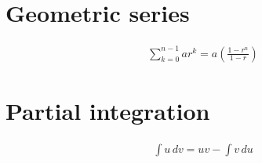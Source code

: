 \section{Geometric series}
\begin{align}
\sum_{k=0}^{n-1} ar^k= a \left(\frac{1-r^{n}}{1-r}\right)
\end{align}

\section{Partial integration}
\begin{align}
    \int u \, dv = uv - \int v \, du
\end{align}
